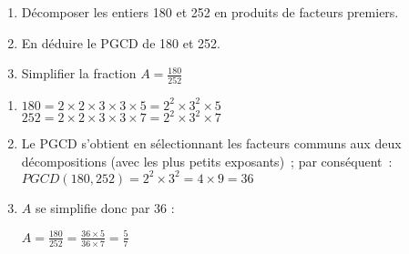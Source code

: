 
\begin{enumerate}
     \item
     Décomposer les entiers 180 et 252 en produits de facteurs premiers.
     \item
     En déduire le PGCD de 180 et 252.
     \item
     Simplifier la fraction $A=\frac{180}{252}$
\end{enumerate}
\begin{corrige}
     \begin{enumerate}
          \item
          $180 = 2  \times 2  \times 3  \times 3  \times 5 = 2^2  \times 3^2  \times 5      $
\\


  $252 = 2  \times 2  \times 3  \times 3  \times 7 =      2^2  \times 3^2  \times 7$
          \item
Le PGCD s'obtient en sélectionnant les facteurs communs aux deux décompositions (avec les plus petits exposants)~; par conséquent~: 
$ PGCD(180, 252) =  2^2  \times 3^2 = 4  \times 9 = 36   $ 
       \item
    $A$ se simplifie donc par $36$ :
          \par
          $A=\frac{180}{252}=\frac{36\times 5}{36\times 7}=\frac{5}{7}$
     \end{enumerate}
\end{corrige}
